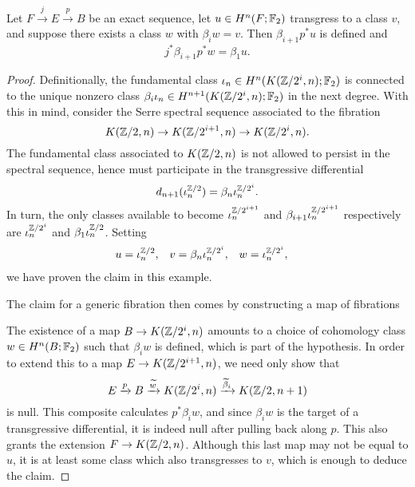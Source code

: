\begin{theorem}\label{BocksteinLemma}
Let $F \xrightarrow j E \xrightarrow p B$ be an exact sequence, let $u \in H^n(F; \mathbb F_2)$ transgress to a class $v$, and suppose there exists a class $w$ with $\beta_i w = v$.  Then $\beta_{i+1} p^* u$ is defined and \[j^* \beta_{i+1} p^* w = \beta_1 u.\]
\end{theorem}
\begin{proof}
Definitionally, the fundamental class $\iota_n \in H^n(K(\mathbb Z/2^i, n); \mathbb F_2)$ is connected to the unique nonzero class $\beta_i \iota_n \in H^{n+1}(K(\mathbb Z/2^i, n); \mathbb F_2)$ in the next degree.
With this in mind, consider the Serre spectral sequence associated to the fibration \[K(\mathbb Z/2, n) \to K(\mathbb Z/2^{i+1}, n) \to K(\mathbb Z/2^i, n).\]
The fundamental class associated to $K(\mathbb Z/2, n)$ is not allowed to persist in the spectral sequence, hence must participate in the transgressive differential \[d_{n+1}(\iota_n^{\mathbb Z/2}) = \beta_n \iota_n^{\mathbb Z/2^i}.\]
In turn, the only classes available to become $\iota_n^{\mathbb Z/2^{i+1}}$ and $\beta_{i+1} \iota_n^{\mathbb Z/2^{i+1}}$ respectively are $\iota_n^{\mathbb Z/2^i}$ and $\beta_1 \iota_n^{\mathbb Z/2}$.
Setting
\begin{align*}
u & = \iota_n^{\mathbb Z/2}, &
v & = \beta_n \iota_n^{\mathbb Z/2^i}, &
w & = \iota_n^{\mathbb Z/2^i},
\end{align*}
we have proven the claim in this example.

The claim for a generic fibration then comes by constructing a map of fibrations
\begin{center}
\end{center}
The existence of a map $B \to K(\mathbb Z/2^i, n)$ amounts to a choice of cohomology class $w \in H^n(B; \mathbb F_2)$ such that $\beta_i w$ is defined, which is part of the hypothesis.
In order to extend this to a map $E \to K(\mathbb Z/2^{i+1}, n)$, we need only show that \[E \xrightarrow p B \xrightarrow{\widetilde w} K(\mathbb Z/2^i, n) \xrightarrow{\widetilde \beta_i} K(\mathbb Z/2, n+1)\] is null.
This composite calculates $p^* \beta_i w$, and since $\beta_i w$ is the target of a transgressive differential, it is indeed null after pulling back along $p$.
This also grants the extension $F \to K(\mathbb Z/2, n)$.
Although this last map may not be equal to $u$, it is at least some class which also transgresses to $v$, which is enough to deduce the claim.
\end{proof}

